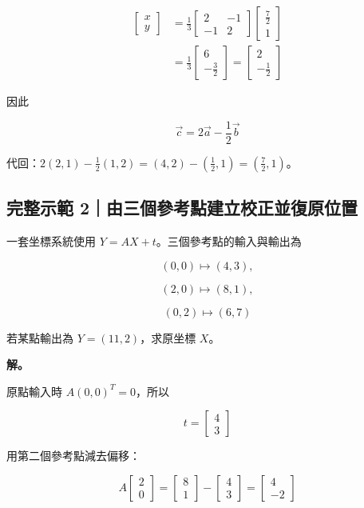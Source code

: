 \documentclass[11pt,a4paper]{article}
\begin{document}
\[
\begin{aligned}
\begin{bmatrix}x\\y\end{bmatrix}
&=\frac13
\begin{bmatrix}2&-1\\-1&2\end{bmatrix}
\begin{bmatrix}\frac72\\1\end{bmatrix}\\
&=\frac13\begin{bmatrix}6\\-\frac32\end{bmatrix}
=\begin{bmatrix}2\\-\frac12\end{bmatrix}
\end{aligned}
\]

因此

\[
\vec c=2\vec a-\frac12\vec b
\]

代回：\(2(2,1)-\frac12(1,2)=(4,2)-(\frac12,1)=(\frac72,1)\)。

\subsection{完整示範 2｜由三個參考點建立校正並復原位置}\label{ux5b8cux6574ux793aux7bc4-2ux7531ux4e09ux500bux53c3ux8003ux9edeux5efaux7acbux6821ux6b63ux4e26ux5fa9ux539fux4f4dux7f6e}

一套坐標系統使用 \(Y=AX+t\)。三個參考點的輸入與輸出為

\[
(0,0)\mapsto(4,3),
\]

\[
(2,0)\mapsto(8,1),
\]

\[
(0,2)\mapsto(6,7)
\]

若某點輸出為 \(Y=(11,2)\)，求原坐標 \(X\)。

\textbf{解。}

原點輸入時 \(A(0,0)^T=0\)，所以

\[
t=\begin{bmatrix}4\\3\end{bmatrix}
\]

用第二個參考點減去偏移：

\[
A\begin{bmatrix}2\\0\end{bmatrix}
=\begin{bmatrix}8\\1\end{bmatrix}
-\begin{bmatrix}4\\3\end{bmatrix}
=\begin{bmatrix}4\\-2\end{bmatrix}
\]
\end{document}
